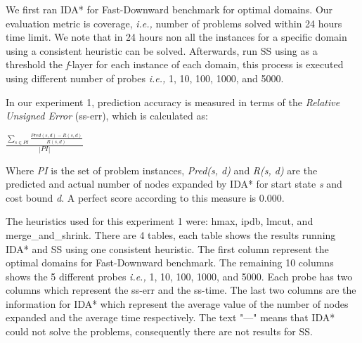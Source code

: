 \documentclass[a4paper,12pt]{article}
\begin{document}
We first ran IDA* for Fast-Downward benchmark for optimal domains. Our evaluation metric is coverage, \textit{i.e.,} number of problems solved within 24 hours time limit. We note that in 24 hours non all the instances for a specific domain using a consistent heuristic can be solved. Afterwards, run SS using as a threshold the \textit{f}-layer for each instance of each domain, this process is executed using different number of probes \textit{i.e.,} 1, 10, 100, 1000, and 5000. 

In our experiment 1, prediction accuracy is measured in terms of the \textit{Relative Unsigned Error} (ss-err), which is calculated as:


\begin{center}
$
\frac{\sum_{s\in PI} \frac{Pred(s, d) - R(s, d)}{R(s, d)}}{|PI|}
$
\end{center}

Where \textit{PI} is the set of problem instances, \textit{Pred(s, d)} and \textit{R(s, d)} are the predicted and actual number of nodes expanded by IDA* for start state \textit{s} and cost bound \textit{d}. A perfect score according to this measure is 0.000.


The heuristics used for this experiment 1 were: hmax, ipdb, lmcut, and {merge\_and\_shrink}. There are 4 tables, each table shows the results running IDA* and SS using one consistent heuristic. The first column represent the optimal domains for Fast-Downward benchmark. The remaining 10 columns shows the 5 different probes \textit{i.e.,} 1, 10, 100, 1000, and 5000. Each probe has two columns which represent the ss-err and the ss-time. The last two columns are the information for IDA* which represent the average value of the number of nodes expanded and the average time respectively. The text "---" means that IDA* could not solve the problems, consequently there are not results for SS.
\end{document}
